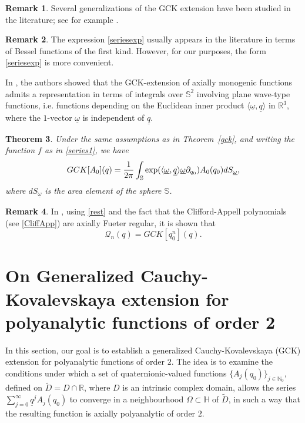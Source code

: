 \documentclass[reqno,11pt]{amsart}
\numberwithin{equation}{section}
\newtheorem{theorem}{Theorem}[section]
\theoremstyle{definition}
\newtheorem{remark}[theorem]{{\bf Remark}}
\begin{document}
\begin{remark}
Several generalizations of the GCK extension have been studied in the literature; see for example \cite{DS1, GU}.
\end{remark}


\begin{remark}
	The expression \eqref{seriesexp} usually appears in the literature in terms of Bessel functions of the first kind. However, for our purposes, the form \eqref{seriesexp} is more convenient.
\end{remark}




In \cite{DS1}, the authors showed that the GCK-extension of axially monogenic functions admits a representation in terms of integrals over $\mathbb{S}^{2}$ involving plane wave-type functions, i.e. functions depending on the Euclidean inner product $\langle \underline{\omega}, \underline{q} \rangle$ in $\mathbb{R}^3$, where the $1$-vector $\underline{\omega}$ is independent of $\underline{q}$.

\begin{theorem}
\label{GCKplane}
Under the same assumptions as in Theorem~\ref{gck}, and writing the function $f$ as in \eqref{series1}, we have
$$ GCK[A_0](q)= \frac{1}{2 \pi} \int_{\mathbb{S}} \hbox{exp}(\langle \underline{\omega}, \underline{q} \rangle \underline{\omega} \partial_{q_0}) A_0(q_0)dS_{\underline{\omega}},$$
where $dS_{\underline{\omega}}$ is the area element of the sphere $ \mathbb{S}$.
\end{theorem}


\begin{remark}
In \cite{DDG}, using \eqref{rest} and the fact that the Clifford-Appell polynomials (see \eqref{CliffApp}) are axially Fueter regular, it is shown that
\begin{equation}
	\label{res}
	\mathcal{Q}_{n}(q)=GCK[q_0^n](q).
\end{equation}
\end{remark}






\section{On Generalized Cauchy-Kovalevskaya extension for polyanalytic functions of order 2}

In this section, our goal is to establish a generalized Cauchy-Kovalevskaya (GCK) extension for polyanalytic functions of order $2$. The idea is to examine the conditions under which a set of quaternionic-valued functions $\{A_j(q_0)\}_{j \in \mathbb{N}_0}$, defined on $\tilde{D}=D \cap \mathbb{R}$, where $D$ is an intrinsic complex domain, allows the series
$
\sum_{j=0}^{\infty} \underline{q}^j A_j(q_0)
$
to converge in a neighbourhood $\Omega \subset \mathbb{H}$ of $\tilde{D}$, in such a way that the resulting function is axially polyanalytic of order $2$.
\end{document}
